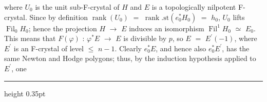\documentclass[9pt]{article}
\newcommand{\CanonText}[1]{\par{\fontsize{8.0}{9.35}\selectfont\RaggedRight #1\par}\vspace{2.2pt}}
\begin{document}
\begin{minipage}[t][\dimexpr\textheight-5pt\relax][t]{\textwidth}
\CanonText{where \(U_{0}\) is the unit sub-F-crystal of \(H\) and \(E\) is a topologically nilpotent F-crystal. Since by definition \(\operatorname{rank}(U_{0})\) \(=\) \(\operatorname{rank}.\text{st}(e_{0}^{*}H_{0})\) \(=\) \(h_{0}\), \(U_{0}\) lifts \(\operatorname{Fil}_{0}H_{0}\); hence the projection \(H\) \(\to{}\) \(E\) induces an isomorphism \(\operatorname{Fil}^{1}H_{0}\) \(\simeq{}\) \(E_{0}\). This means that \(F(\varphi{})\) : \(\varphi{}^{*}E\) \(\to{}\) \(E\) is divisible by \(p\), so \(E\) \(=\) \(E^{\prime}(-1)\), where \(E^{\prime}\) is an F-crystal of level \(\leq{}\) \(n-1\). Clearly \(e_{0}^{*}E\), and hence also \(e_{0}^{*}E^{\prime}\), has the same Newton and Hodge polygons; thus, by the induction hypothesis applied to \(E^{\prime}\), one}
\vfill
{\color{Accent}\hrule height 0.35pt}\vspace{3pt}
\end{minipage}
\newpage
\end{document}
